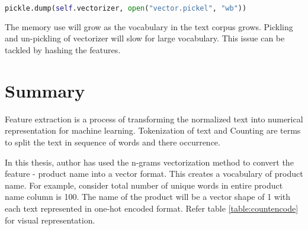 \begin{lstlisting}[language=Python,label=pickle, caption={Pickle vectorization}]
    pickle.dump(self.vectorizer, open("vector.pickel", "wb"))
\end{lstlisting}

The memory use will grow as the vocabulary in the text corpus grows.  Pickling and un-pickling of vectorizer will slow for large vocabulary.
This issue can be tackled by hashing the features. 

\section{Summary}

Feature extraction is a process of transforming the normalized text into numerical representation for machine learning.  Tokenization of text and Counting are terms to split the text in sequence of words and there occurrence. 

In this thesis, author has used the n-grams vectorization method to convert the feature - product name into a vector format. This creates a vocabulary of product name. For example, consider total number of unique words in entire product name column is 100. The name of the product will be a vector shape of 1  with each text represented in one-hot encoded format. Refer table \ref{table:countencode} for visual representation.